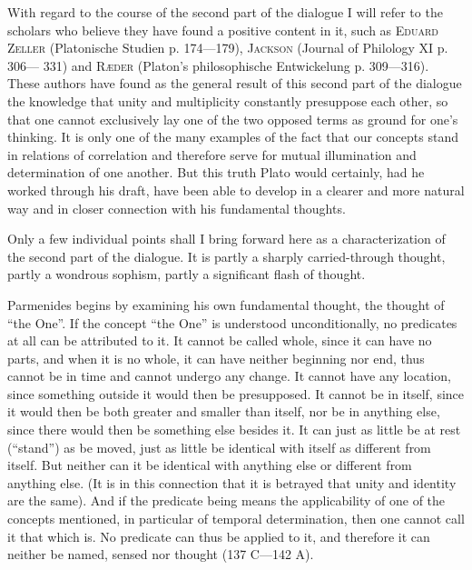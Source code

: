 \documentclass[12pt,a4paper,openany]{book}
\newcommand{\opage}[1]{\marginnote{\footnotesize\textit{[#1]}}}
\begin{document}
With regard to the course of the second part of the dialogue I will
refer to the scholars who believe they have found a positive
content in it, such as \textsc{Eduard} \textsc{Zeller} (Platonische Studien
p. 174—179), \textsc{Jackson} (Journal of Philology XI p. 306—
331) and \textsc{Ræder} (Platon’s philosophische Entwickelung
\setcounter{footnote}{0}%
\opage{30}p. 309—316). These authors have found as the general result
of this second part of the dialogue the knowledge
that unity and multiplicity constantly presuppose each other,
so that one cannot exclusively lay one of the two opposed terms
as ground for one’s thinking. It is only one of the
many examples of the fact that our concepts stand in relations of correlation
and therefore serve for mutual illumination and determination
of one another. But this truth Plato would certainly,
had he worked through his draft, have been able to
develop in a clearer and more natural way and in
closer connection with his fundamental thoughts.

Only a few individual points shall I bring forward here as
a characterization of the second part of the dialogue. It is partly a sharply
carried-through thought, partly a wondrous sophism, partly a
significant flash of thought.

Parmenides begins by examining his own fundamental thought,
the thought of ``the One''. If the concept ``the One'' is
understood unconditionally, no predicates at all can be attributed to
it. It cannot be called whole, since it can have no parts,
and when it is no whole, it can have neither beginning
nor end, thus cannot be in time and cannot undergo
any change. It cannot have any location,
since something outside it would then be presupposed. It cannot
be in itself, since it would then be both greater and
smaller than itself, nor be in anything else, since
there would then be something else besides it. It can just as
little be at rest (``stand'') as be moved, just as little
be identical with itself as different from itself.
But neither can it be identical with anything else
or different from anything else. (It is in this connection
that it is betrayed that unity and identity are the same). And
if the predicate being means the applicability of one of the
\setcounter{footnote}{0}%
\opage{31}concepts mentioned, in particular of temporal determination, then one cannot
call it that which is. No predicate can thus be applied
to it, and therefore it can neither be named, sensed nor
thought (137 C—142 A).
\end{document}
